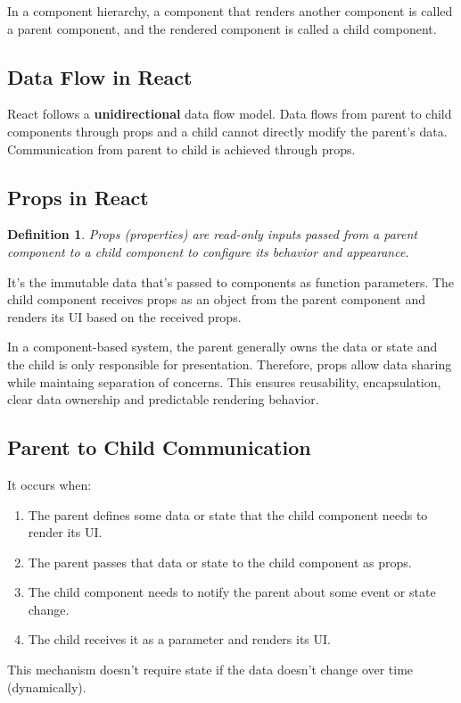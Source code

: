 \documentclass[12pt, a4paper]{report}
\newtheorem{definition}{Definition}
\begin{document}
    In a component hierarchy, a component that renders another component is called a parent component, and the rendered component is called a child component.

    \subsection{Data Flow in React}
    React follows a \textbf{unidirectional} data flow model. Data flows from parent to child components through props and a child cannot directly modify the parent's data. Communication from parent to child is achieved through props.
    \subsection{Props in React}
    \begin{definition}
        Props (properties) are read-only inputs passed from a parent component to a child component to configure its behavior and appearance.
    \end{definition}
    It's the immutable data that's passed to components as function parameters. The child component receives props as an object from the parent component and renders its UI based on the received props.

    In a component-based system, the parent generally owns the data or state and the child is only responsible for presentation. Therefore, props allow data sharing while maintaing separation of concerns. This ensures reusability, encapsulation, clear data ownership and predictable rendering behavior.

    \subsection{Parent to Child Communication}
    It occurs when:
    \begin{enumerate}
        \item The parent defines some data or state that the child component needs to render its UI.
        \item The parent passes that data or state to the child component as props.
        \item The child component needs to notify the parent about some event or state change.
        \item The child receives it as a parameter and renders its UI.
    \end{enumerate}
    This mechanism doesn't require state if the data doesn't change over time (dynamically).
\end{document}
